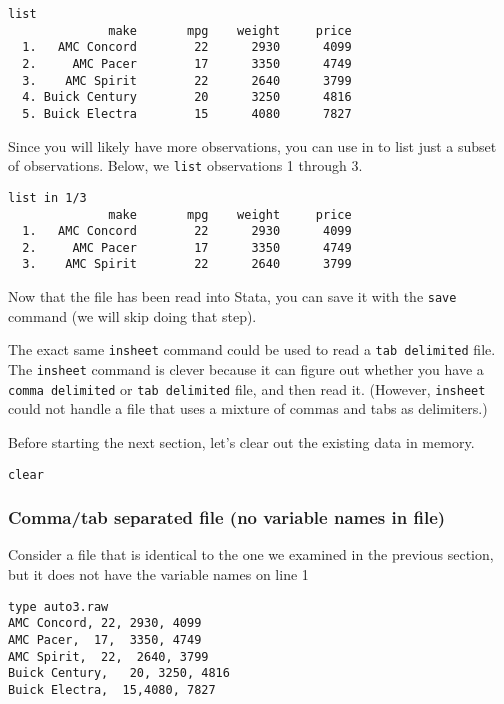 \begin{lstlisting}
list
              make       mpg    weight     price
  1.   AMC Concord        22      2930      4099
  2.     AMC Pacer        17      3350      4749
  3.    AMC Spirit        22      2640      3799
  4. Buick Century        20      3250      4816
  5. Buick Electra        15      4080      7827
\end{lstlisting}

Since you will likely have more observations, you can use in to list just a subset of observations. Below, we \lstinline{list} observations 1 through 3.

\begin{lstlisting}
list in 1/3
              make       mpg    weight     price
  1.   AMC Concord        22      2930      4099
  2.     AMC Pacer        17      3350      4749
  3.    AMC Spirit        22      2640      3799
\end{lstlisting}

Now that the file has been read into Stata, you can save it with the \lstinline{save} command (we will skip doing that step).

The exact same \lstinline{insheet} command could be used to read a \lstinline{tab delimited} file. The \lstinline{insheet} command is clever because it can figure out whether you have a \lstinline{comma delimited} or \lstinline{tab delimited} file, and then read it. (However, \lstinline{insheet} could not handle a file that uses a mixture of commas and tabs as delimiters.)

Before starting the next section, let's clear out the existing data in memory.

\begin{lstlisting}
clear
\end{lstlisting}

\subsubsection{Comma/tab separated file (no variable names in file)}

Consider a file that is identical to the one we examined in the previous section, but it does not have the variable names on line 1

\begin{lstlisting}
type auto3.raw
AMC Concord, 22, 2930, 4099
AMC Pacer,  17,  3350, 4749
AMC Spirit,  22,  2640, 3799
Buick Century,   20, 3250, 4816
Buick Electra,  15,4080, 7827
\end{lstlisting}


